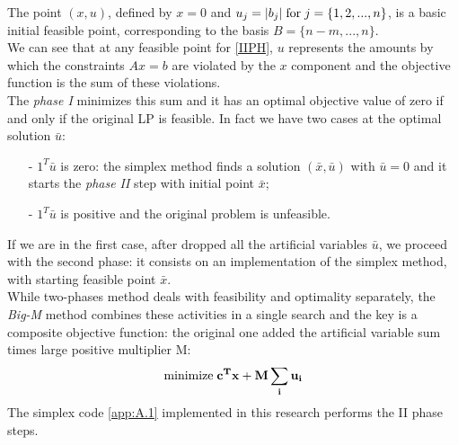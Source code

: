 \documentclass[a4paper,10 pt,titlepage,twoside]{book}
\theoremstyle{plain}
\theoremstyle{definition}
\theoremstyle{remark}
\begin{document}
The point $(x,u)$, defined by $x = 0$ and $u_{j} = |b_{j}| \text{\;for\;}j =\{1,2,...,n\}$, is a basic initial feasible point, corresponding to the basis $B = \{n-m,...,n\}$.\\ We can see that at any feasible point for \ref{IIPH}, $u$ represents the amounts by which the constraints $Ax = b$ are violated by the $x$ component and the objective function is the sum of these violations. \\
The \textit{phase I} minimizes this sum and it has an optimal objective value of zero if and only if the original LP is feasible. In fact we have two cases at the optimal solution $\bar{u}$: 
\begin{itemize}
	\item[-]$1^{T}\bar{u}$ is zero: the simplex method finds a solution $(\bar{x},\bar{u})$ with $\bar{u}=0$ and it starts the \textit{phase II} step with initial point $\bar{x}$;
	\item[-]$1^{T}\bar{u}$ is positive and the original problem is unfeasible.
\end{itemize}
If we are in the first case, after dropped all the artificial variables $\bar{u}$, we proceed with the second phase: it consists on an implementation of the simplex method, with starting feasible point $\bar{x}$.\\ 
While two-phases method deals with feasibility and optimality separately, the \textit{Big-M} method combines these activities in a single search and the key is a composite objective function: the original one added the artificial variable sum times  large positive multiplier M:\\
\begin{equation}
\text{minimize\;}\mathbf{c^{T}x+M \sum_{i}{u}_{i}}\\
\end{equation}
The simplex code \ref{app:A.1} implemented in this research performs the II phase steps.
\end{document}
